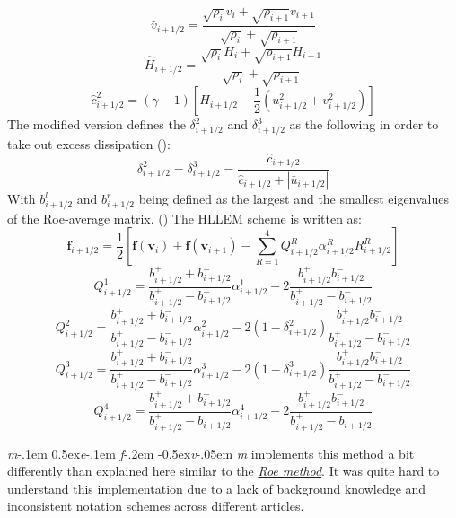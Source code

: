 \documentclass[a4paper, 12pt]{article}
\newcommand\mefvm{%
    \textit{m}\kern-.1em%
    \raise0.5ex\hbox{\textit{e}}\kern-.1em%
    \textit{f}\kern-.2em%
    \raise-0.5ex\hbox{\textit{v}}\kern-.05em%
    \textit{m}
}
\begin{document}
\begin{equation}
    \hat v_{i+1/2}=\dfrac{\sqrt{\rho_i}v_i+\sqrt{\rho_{i+1}}v_{i+1}}{\sqrt{\rho_i}+\sqrt{\rho_{i+1}}}
\end{equation}
\begin{equation}
    \hat H_{i+1/2}=\dfrac{\sqrt{\rho_i}H_i+\sqrt{\rho_{i+1}}H_{i+1}}{\sqrt{\rho_i}+\sqrt{\rho_{i+1}}}
\end{equation}
\begin{equation}
    \hat c^2_{i+1/2}=(\gamma-1)\left[ H_{i+1/2}-\dfrac{1}{2}(u_{i+1/2}^2+v_{i+1/2}^2)\right]
\end{equation}
The modified version defines the $\delta^2_{i+1/2}$ and $\delta^3_{i+1/2}$ as the following in order to take out excess dissipation (\cite{hllem}):
\begin{equation}
    \delta^2_{i+1/2}=\delta^3_{i+1/2}=\dfrac{\hat c_{i+1/2}}{\hat c_{i+1/2}+|\bar u_{i+1/2}|}
\end{equation}
With $b^l_{i+1/2}$ and $b^r_{i+1/2}$ being defined as the largest and the smallest eigenvalues of the Roe-average matrix. (\cite{hllem}) The HLLEM scheme is written as:
\begin{equation}
    \textbf{f}_{i+1/2}=\dfrac{1}{2}\left[\textbf{f}(\textbf{v}_i)+\textbf{f}(\textbf{v}_{i+1})-\sum^4_{R=1}Q_{i+1/2}^R\alpha_{i+1/2}^RR_{i+1/2}^R\right]
\end{equation}
\begin{equation}
    Q^1_{i+1/2} = \dfrac{b^+_{i+1/2}+b^-_{i+1/2}}{b^+_{i+1/2}-b^-_{i+1/2}}\alpha^1_{i+1/2}-2\dfrac{b^+_{i+1/2}b^-_{i+1/2}}{b^+_{i+1/2}-b^-_{i+1/2}}
\end{equation}
\begin{equation}
    Q^2_{i+1/2}=\dfrac{b^+_{i+1/2}+b^-_{i+1/2}}{b^+_{i+1/2}-b^-_{i+1/2}}\alpha^2_{i+1/2}-2(1-\delta^2_{i+1/2})\dfrac{b^+_{i+1/2}b^-_{i+1/2}}{b^+_{i+1/2}-b^-_{i+1/2}}
\end{equation}
\begin{equation}
    Q^3_{i+1/2}=\dfrac{b^+_{i+1/2}+b^-_{i+1/2}}{b^+_{i+1/2}-b^-_{i+1/2}}\alpha^3_{i+1/2}-2(1-\delta^3_{i+1/2})\dfrac{b^+_{i+1/2}b^-_{i+1/2}}{b^+_{i+1/2}-b^-_{i+1/2}}
\end{equation}
\begin{equation}
    Q^4_{i+1/2} = \dfrac{b^+_{i+1/2}+b^-_{i+1/2}}{b^+_{i+1/2}-b^-_{i+1/2}}\alpha^4_{i+1/2}-2\dfrac{b^+_{i+1/2}b^-_{i+1/2}}{b^+_{i+1/2}-b^-_{i+1/2}}
\end{equation}\par
\mefvm implements this method a bit differently than explained here similar to the \hyperref[roe]{\textit{Roe method}}. It was quite hard to understand this implementation due to a lack of background knowledge and inconsistent notation schemes across different articles. 
\end{document}
